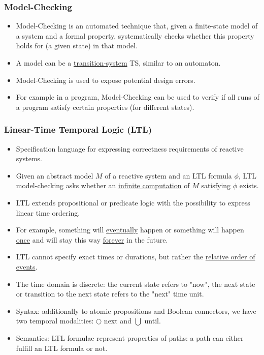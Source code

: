 \documentclass[a4paper,12pt]{article}
\begin{document}
\subsubsection{Model-Checking}
\begin{itemize}
	\item Model-Checking is an automated technique that, given a finite-state model of a system and a formal property, systematically checks whether this property holds for (a given state) in that model.
	\item A model can be a \ul{transition-system} TS, similar to an automaton.
	\item Model-Checking is used to expose potential design errors.
	\item For example in a program, Model-Checking can be used to verify if all runs of a program satisfy certain properties (for different states).
\end{itemize}
\subsubsection{Linear-Time Temporal Logic (LTL)}
\begin{itemize}
	\item Specification language for expressing correctness requirements of reactive systems.
	\item Given an abstract model $M$ of a reactive system and an LTL formula $\phi$, LTL model-checking asks whether an \ul{infinite computation} of $M$ satisfying $\phi$ exists.
	\item LTL extends propositional or predicate logic with the possibility to express linear time ordering.
	\item For example, something will \ul{eventually} happen or something will happen \ul{once} and will stay this way \ul{forever} in the future.
	\item LTL cannot specify exact times or durations, but rather the \ul{relative order of events}.
	\item The time domain is discrete: the current state refers to "now", the next state or transition to the next state refers to the "next" time unit.
	\item Syntax: additionally to atomic propositions and Boolean connectors, we have two temporal modalities: $\bigcirc$ next and $\bigcup$ until.
	\item Semantics: LTL formulae represent properties of paths: a path can either fulfill an LTL formula or not.
\end{itemize}
\end{document}
